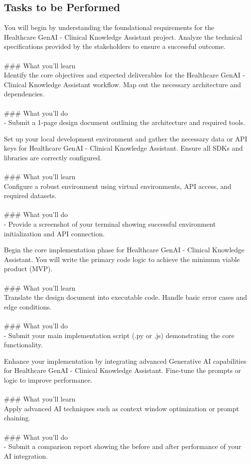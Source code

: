\documentclass{article}
\begin{document}
\subsection*{Tasks to be Performed}
You will begin by understanding the foundational requirements for the Healthcare GenAI - Clinical Knowledge Assistant project. Analyze the technical specifications provided by the stakeholders to ensure a successful outcome. \\
 \\
### What you'll learn \\
Identify the core objectives and expected deliverables for the Healthcare GenAI - Clinical Knowledge Assistant workflow. Map out the necessary architecture and dependencies. \\
 \\
### What you'll do \\
- Submit a 1-page design document outlining the architecture and required tools.

Set up your local development environment and gather the necessary data or API keys for Healthcare GenAI - Clinical Knowledge Assistant. Ensure all SDKs and libraries are correctly configured. \\
 \\
### What you'll learn \\
Configure a robust environment using virtual environments, API access, and required datasets. \\
 \\
### What you'll do \\
- Provide a screenshot of your terminal showing successful environment initialization and API connection.

Begin the core implementation phase for Healthcare GenAI - Clinical Knowledge Assistant. You will write the primary code logic to achieve the minimum viable product (MVP). \\
 \\
### What you'll learn \\
Translate the design document into executable code. Handle basic error cases and edge conditions. \\
 \\
### What you'll do \\
- Submit your main implementation script (.py or .js) demonstrating the core functionality.

Enhance your implementation by integrating advanced Generative AI capabilities for Healthcare GenAI - Clinical Knowledge Assistant. Fine-tune the prompts or logic to improve performance. \\
 \\
### What you'll learn \\
Apply advanced AI techniques such as context window optimization or prompt chaining. \\
 \\
### What you'll do \\
- Submit a comparison report showing the before and after performance of your AI integration.
\end{document}
